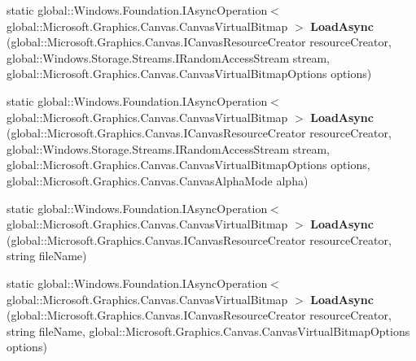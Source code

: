 \begin{DoxyCompactItemize}
static global\+::\+Windows.\+Foundation.\+I\+Async\+Operation$<$ global\+::\+Microsoft.\+Graphics.\+Canvas.\+Canvas\+Virtual\+Bitmap $>$ {\bfseries Load\+Async} (global\+::\+Microsoft.\+Graphics.\+Canvas.\+I\+Canvas\+Resource\+Creator resource\+Creator, global\+::\+Windows.\+Storage.\+Streams.\+I\+Random\+Access\+Stream stream, global\+::\+Microsoft.\+Graphics.\+Canvas.\+Canvas\+Virtual\+Bitmap\+Options options)
\item 
\mbox{\label{class_microsoft_1_1_graphics_1_1_canvas_1_1_canvas_virtual_bitmap_abba7eac1de7fc7da41f8546a18aef233}} 
static global\+::\+Windows.\+Foundation.\+I\+Async\+Operation$<$ global\+::\+Microsoft.\+Graphics.\+Canvas.\+Canvas\+Virtual\+Bitmap $>$ {\bfseries Load\+Async} (global\+::\+Microsoft.\+Graphics.\+Canvas.\+I\+Canvas\+Resource\+Creator resource\+Creator, global\+::\+Windows.\+Storage.\+Streams.\+I\+Random\+Access\+Stream stream, global\+::\+Microsoft.\+Graphics.\+Canvas.\+Canvas\+Virtual\+Bitmap\+Options options, global\+::\+Microsoft.\+Graphics.\+Canvas.\+Canvas\+Alpha\+Mode alpha)
\item 
\mbox{\label{class_microsoft_1_1_graphics_1_1_canvas_1_1_canvas_virtual_bitmap_a8596f4617ef7a7e9c1a1464d4674e40c}} 
static global\+::\+Windows.\+Foundation.\+I\+Async\+Operation$<$ global\+::\+Microsoft.\+Graphics.\+Canvas.\+Canvas\+Virtual\+Bitmap $>$ {\bfseries Load\+Async} (global\+::\+Microsoft.\+Graphics.\+Canvas.\+I\+Canvas\+Resource\+Creator resource\+Creator, string file\+Name)
\item 
\mbox{\label{class_microsoft_1_1_graphics_1_1_canvas_1_1_canvas_virtual_bitmap_a8f0bf16c94a9957cd9b4f30b7c8369f8}} 
static global\+::\+Windows.\+Foundation.\+I\+Async\+Operation$<$ global\+::\+Microsoft.\+Graphics.\+Canvas.\+Canvas\+Virtual\+Bitmap $>$ {\bfseries Load\+Async} (global\+::\+Microsoft.\+Graphics.\+Canvas.\+I\+Canvas\+Resource\+Creator resource\+Creator, string file\+Name, global\+::\+Microsoft.\+Graphics.\+Canvas.\+Canvas\+Virtual\+Bitmap\+Options options)
\item 
\mbox{\label{class_microsoft_1_1_graphics_1_1_canvas_1_1_canvas_virtual_bitmap_a72cf413902f0758c4707d6fc9c560914}} 

\end{DoxyCompactItemize}
